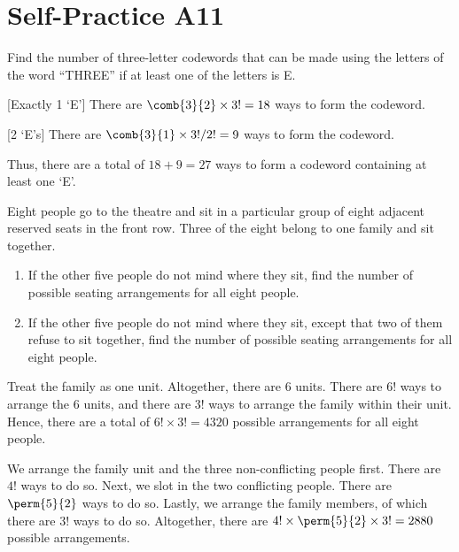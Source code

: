 \section{Self-Practice A11}

\begin{problem}
    Find the number of three-letter codewords that can be made using the letters of the word ``THREE'' if at least one of the letters is E. 
\end{problem}
\begin{solution}
    \phantom{.}

    [Exactly 1 `E'] There are $\comb{3}{2} \times 3! = 18$ ways to form the codeword.

    [2 `E's] There are $\comb{3}{1} \times 3!/2! = 9$ ways to form the codeword.

    Thus, there are a total of $18 + 9 = 27$ ways to form a codeword containing at least one `E'.
\end{solution}

\begin{problem}
    Eight people go to the theatre and sit in a particular group of eight adjacent reserved seats in the front row. Three of the eight belong to one family and sit together. 
    
    \begin{enumerate}
        \item If the other five people do not mind where they sit, find the number of possible seating arrangements for all eight people.
        \item If the other five people do not mind where they sit, except that two of them refuse to sit together, find the number of possible seating arrangements for all eight people.
    \end{enumerate}
\end{problem}
\begin{solution}
    \begin{ppart}
        Treat the family as one unit. Altogether, there are 6 units. There are $6!$ ways to arrange the 6 units, and there are $3!$ ways to arrange the family within their unit. Hence, there are a total of $6! \times 3! = 4320$ possible arrangements for all eight people.
    \end{ppart}
    \begin{ppart}
        We arrange the family unit and the three non-conflicting people first. There are $4!$ ways to do so. Next, we slot in the two conflicting people. There are $\perm{5}{2}$ ways to do so. Lastly, we arrange the family members, of which there are $3!$ ways to do so. Altogether, there are $4! \times \perm{5}{2} \times 3! = 2880$ possible arrangements.
    \end{ppart}
\end{solution}

